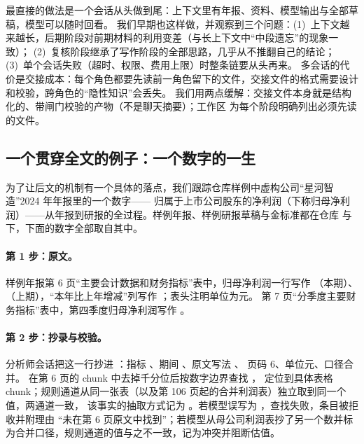 \begin{tradeoff}
最直接的做法是一个会话从头做到尾：上下文里有年报、资料、模型输出与全部草稿，模型可以随时回看。
我们早期也这样做，并观察到三个问题：(1)~上下文越来越长，后期阶段对前期材料的利用变差（与长上下文中“中段遗忘”的现象一致）；
(2)~复核阶段继承了写作阶段的全部思路，几乎从不推翻自己的结论；(3)~单个会话失败（超时、权限、费用上限）时整条链要从头再来。
多会话的代价是交接成本：每个角色都要先读前一角色留下的文件，交接文件的格式需要设计和校验，跨角色的“隐性知识”会丢失。
我们用两点缓解：交接文件本身就是结构化的、带闸门校验的产物（不是聊天摘要）；工作区  为每个阶段明确列出必须先读的文件。
\end{tradeoff}

\subsection{一个贯穿全文的例子：一个数字的一生}
\label{sec:intro-example}

为了让后文的机制有一个具体的落点，我们跟踪仓库样例中虚构公司“星河智造”2024 年年报里的一个数字——
归属于上市公司股东的净利润（下称归母净利润）——从年报到研报的全过程。样例年报、样例研报草稿与金标准都在仓库
 与  下，下面的数字全部取自其中。

\paragraph{第 1 步：原文。}
样例年报第 6 页“主要会计数据和财务指标”表中，归母净利润一行写作 （本期）、
（上期），“本年比上年增减”列写作 ；表头注明单位为元。
第 7 页“分季度主要财务指标”表中，第四季度归母净利润写作 。

\paragraph{第 2 步：抄录与校验。}
分析师会话把这一行抄进 ：指标 、期间 、原文写法 、
页码 6、单位元、口径合并。 在第 6 页的 chunk 中去掉千分位后按数字边界查找 ，
定位到具体表格 chunk；规则通道从同一张表（以及第 106 页起的合并利润表）独立取到同一个值，两通道一致，
该事实的抽取方式记为 。若模型误写为 ，查找失败，条目被拒收并附理由
“未在第 6 页原文中找到”；若模型从母公司利润表抄了另一个数并标为合并口径，规则通道的值与之不一致，记为冲突并阻断估值。

